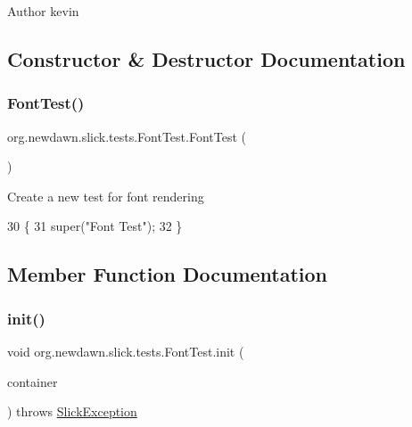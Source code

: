 \begin{DoxyAuthor}{Author}
kevin 
\end{DoxyAuthor}


\subsection{Constructor \& Destructor Documentation}
\mbox{\label{classorg_1_1newdawn_1_1slick_1_1tests_1_1_font_test_acf10f3c52363190d6336752a54cd1ceb}} 
\subsubsection{\texorpdfstring{Font\+Test()}{FontTest()}}
{\footnotesize\ttfamily org.\+newdawn.\+slick.\+tests.\+Font\+Test.\+Font\+Test (\begin{DoxyParamCaption}{ }\end{DoxyParamCaption})\hspace{0.3cm}{\ttfamily [inline]}}

Create a new test for font rendering 
\begin{DoxyCode}
30                       \{
31         super(\textcolor{stringliteral}{"Font Test"});
32     \}
\end{DoxyCode}


\subsection{Member Function Documentation}
\mbox{\label{classorg_1_1newdawn_1_1slick_1_1tests_1_1_font_test_a54b4447244c2c947d57f1c9070e5247d}} 
\subsubsection{\texorpdfstring{init()}{init()}}
{\footnotesize\ttfamily void org.\+newdawn.\+slick.\+tests.\+Font\+Test.\+init (\begin{DoxyParamCaption}\item[{\mbox{\hyperlink{classorg_1_1newdawn_1_1slick_1_1_game_container}{Game\+Container}}}]{container }\end{DoxyParamCaption}) throws \mbox{\hyperlink{classorg_1_1newdawn_1_1slick_1_1_slick_exception}{Slick\+Exception}}\hspace{0.3cm}{\ttfamily [inline]}}

